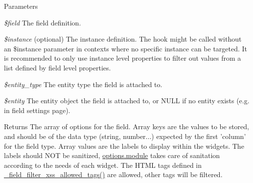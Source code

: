 \begin{DoxyParams}{Parameters}
\item[{\em \$field}]The field definition. \item[{\em \$instance}](optional) The instance definition. The hook might be called without an \$instance parameter in contexts where no specific instance can be targeted. It is recommended to only use instance level properties to filter out values from a list defined by field level properties. \item[{\em \$entity\_\-type}]The entity type the field is attached to. \item[{\em \$entity}]The entity object the field is attached to, or NULL if no entity exists (e.g. in field settings page).\end{DoxyParams}
\begin{DoxyReturn}{Returns}
The array of options for the field. Array keys are the values to be stored, and should be of the data type (string, number...) expected by the first 'column' for the field type. Array values are the labels to display within the widgets. The labels should NOT be sanitized, \hyperlink{options_8module}{options.module} takes care of sanitation according to the needs of each widget. The HTML tags defined in \hyperlink{group__field_ga7ae8de4fae20a2142bb4c8d1e007cda5}{\_\-field\_\-filter\_\-xss\_\-allowed\_\-tags()} are allowed, other tags will be filtered. 
\end{DoxyReturn}
